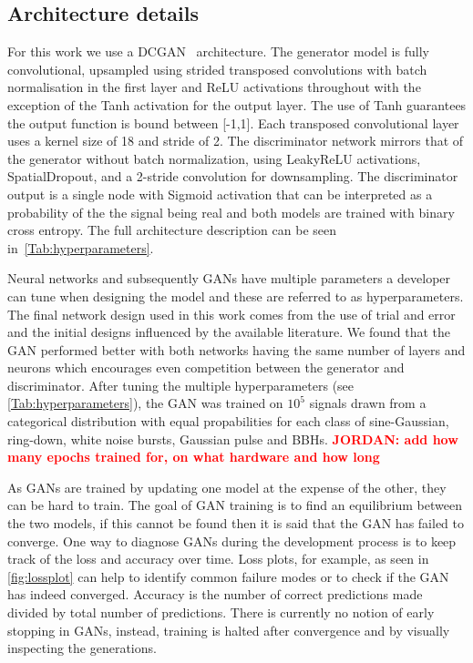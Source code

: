 \documentclass[12pt]{iopart}
\newcommand{\jordan}[1]{\textbf{\textcolor{red}{JORDAN: #1}}}
\begin{document}
\subsection{Architecture details}
%
%
For this work we use a \ac{DCGAN}~\cite{Radford2015} architecture. The generator model is fully convolutional,
upsampled using strided transposed convolutions
with batch normalisation in the
first layer and ReLU activations throughout with the exception of the Tanh activation for
the output layer. The use of Tanh guarantees the output function is bound between [-1,1]. Each transposed
convolutional layer uses a kernel size of 18 and stride of 2. The discriminator network
mirrors that of the generator without batch normalization, using
LeakyReLU activations, SpatialDropout, and a 2-stride convolution for
downsampling. The discriminator output is a single node with Sigmoid activation that can be interpreted as a probability of the the signal being real and both models are trained with binary cross
entropy. The full architecture description can be seen in~\cref{Tab:hyperparameters}.


%
Neural networks and subsequently \acp{GAN} have multiple parameters a developer
can tune when designing the model and these are referred to as hyperparameters.
The final network design used in this work comes from the use of trial and
error and the initial designs influenced by the available literature. We found
that the \ac{GAN} performed better with both networks having the same number of
layers and neurons which encourages even
competition between the generator and discriminator.  After tuning the multiple
hyperparameters (see \cref{Tab:hyperparameters}), the \ac{GAN} was trained on
$10^5$ signals  drawn from a categorical
distribution with equal propabilities for each class of
sine-Gaussian,
ring-down, white noise bursts, Gaussian pulse and \acp{BBH}. \jordan{add how many epochs trained for, on what hardware and how long}

As \acp{GAN} are trained by updating one model at the expense of the other, they can be hard to train. The goal of GAN training is to find an equilibrium between the two models, if this cannot be found then it is said that the \ac{GAN} has failed to converge. One way to diagnose \acp{GAN} during the development process is to keep track of the loss and accuracy over time. Loss plots, for example, as seen in \cref{fig:lossplot} can help to identify common failure modes or to check if the \ac{GAN} has indeed converged. Accuracy is the number of correct predictions made divided by total number of predictions. There is currently no notion of early stopping in \acp{GAN}, instead, training is halted after convergence and by visually inspecting the generations. 
\end{document}
